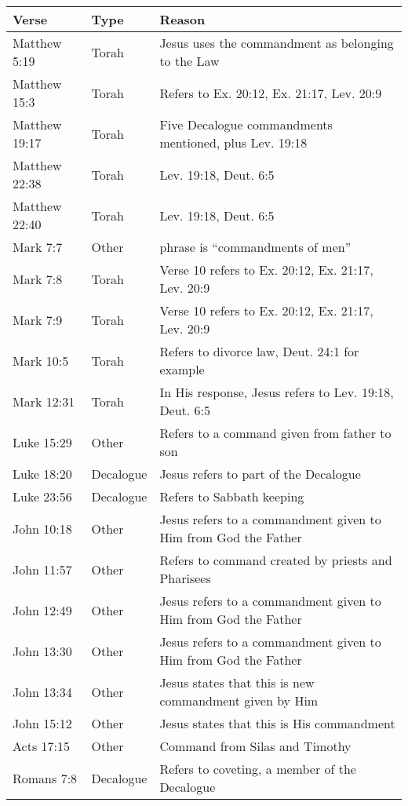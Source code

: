 \documentclass{article}
\begin{document}
\begin{table}
    \footnotesize
    \renewcommand\arraystretch{1.2}
    \begin{tabularx}{\textwidth}{@{}llX@{}}
    \toprule
    Verse & Type & Reason \\
    \midrule
    Matthew 5:19 & Torah & Jesus uses the commandment as belonging to the Law \\
    Matthew 15:3 & Torah & Refers to Ex. 20:12, Ex. 21:17, Lev. 20:9 \\
    Matthew 19:17 & Torah & Five Decalogue commandments mentioned, plus Lev. 19:18 \\
    Matthew 22:38 & Torah & Lev. 19:18, Deut. 6:5\\
    Matthew 22:40 & Torah & Lev. 19:18, Deut. 6:5\\
    Mark 7:7 & Other & phrase is ``commandments of men'' \\
    Mark 7:8 & Torah & Verse 10 refers to Ex. 20:12, Ex. 21:17, Lev. 20:9\\
    Mark 7:9 & Torah & Verse 10 refers to Ex. 20:12, Ex. 21:17, Lev. 20:9\\
    Mark 10:5 & Torah & Refers to divorce law, Deut. 24:1 for example\\
    Mark 12:31 & Torah & In His response, Jesus refers to Lev. 19:18, Deut. 6:5\\
    Luke 15:29 & Other & Refers to a command given from father to son\\
    Luke 18:20 & Decalogue & Jesus refers to part of the Decalogue\\
    Luke 23:56 & Decalogue & Refers to Sabbath keeping\\
    John 10:18 & Other & Jesus refers to a commandment given to Him from God the Father\\
    John 11:57 & Other & Refers to command created by priests and Pharisees\\
    John 12:49 & Other & Jesus refers to a commandment given to Him from God the Father\\
    John 13:30 & Other & Jesus refers to a commandment given to Him from God the Father\\
    John 13:34 & Other & Jesus states that this is new commandment given by Him\\
    John 15:12 & Other & Jesus states that this is His commandment\\
    Acts 17:15 & Other & Command from Silas and Timothy\\
    Romans 7:8 & Decalogue & Refers to coveting, a member of the Decalogue\\

\end{tabularx}
\end{table}
\end{document}
